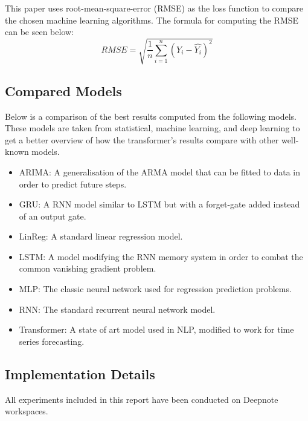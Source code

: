 This paper uses root-mean-square-error (RMSE) as the loss function to compare the chosen machine learning algorithms. The formula for computing the RMSE can be seen below: 
$$RMSE = \sqrt{\frac 1 n \displaystyle\sum_{i=1}^n(Y_i - \hat{Y_i})^2}$$

\subsection{Compared Models}
Below is a comparison of the best results computed from the following models. These models are taken from statistical, machine learning, and deep learning to get a better overview of how the transformer's results compare with other well-known models.
\begin{itemize}
    \item ARIMA: A generalisation of the ARMA model that can be fitted to data in order to predict future steps.
    \item GRU: A RNN model similar to LSTM but with a forget-gate added instead of an output gate.
    \item LinReg: A standard linear regression model.
    \item LSTM: A model modifying the RNN memory system in order to combat the common vanishing gradient problem.
    \item MLP: The classic neural network used for regression prediction problems.
    \item RNN: The standard recurrent neural network model.
    \item Transformer: A state of art model used in NLP, modified to work for time series forecasting.
\end{itemize}

\subsection{Implementation Details}
All experiments included in this report have been conducted on Deepnote workspaces\cite{deepnote}.

